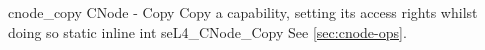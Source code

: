 %
%
%
%

\apidoc
{cnode_copy}
{CNode - Copy}
{Copy a capability, setting its access rights whilst doing so}
{static inline int seL4\_CNode\_Copy}
{
}
{\errorenumdesc}
{See \autoref{sec:cnode-ops}.}

